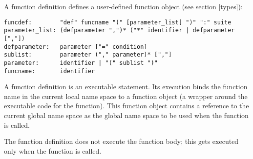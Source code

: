 A function definition defines a user-defined function object (see
section \ref{types}):

\begin{verbatim}
funcdef:        "def" funcname "(" [parameter_list] ")" ":" suite
parameter_list: (defparameter ",")* ("*" identifier | defparameter [","])
defparameter:   parameter ["=" condition]
sublist:        parameter ("," parameter)* [","]
parameter:      identifier | "(" sublist ")"
funcname:       identifier
\end{verbatim}

A function definition is an executable statement.  Its execution binds
the function name in the current local name space to a function object
(a wrapper around the executable code for the function).  This
function object contains a reference to the current global name space
as the global name space to be used when the function is called.

The function definition does not execute the function body; this gets
executed only when the function is called.

